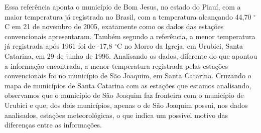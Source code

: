 Essa referência aponta o município de Bom Jesus, no estado do Piauí, com a maior temperatura já registrada no Brasil, com a temperatura alcançando 44,70 $^{\circ}$C em 21 de novembro de 2005, exatamente como os dados das estações convencionais apresentaram.  Também segundo a referência, a menor temperatura já registrada após 1961 foi de -17,8 $^{\circ}$C no Morro da Igreja, em Urubici, Santa Catarina, em 29 de junho de 1996. Analisando os dados, diferente do que apontou a informação encontrada, a menor temperatura registrada pelas estações convencionais foi no município de São Joaquim, em Santa Catarina. Cruzando o mapa de municípios de Santa Catarina com as estações que estamos analisando, observamos que o município de São Joaquim faz fronteira com o município de Urubici e que, dos dois municípios, apenas o de São Joaquim possui, nos dados analisados, estações meteorológicas, o que indica um possível motivo das diferenças entre as informações.